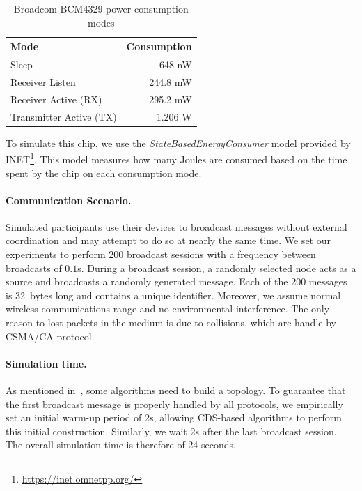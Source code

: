 \begin{table}[ht]
	\footnotesize
	\centering
	
	\begin{tabular}{lr}
		\textbf{Mode} & \textbf{Consumption} \\
		
		\midrule
		Sleep  & 648 nW \\ 
		Receiver Listen & 244.8 mW \\
		Receiver Active (RX) & 295.2 mW \\
		Transmitter Active (TX) & 1.206 W \\
	\end{tabular}
	
	\caption{Broadcom BCM4329 power consumption modes}
\end{table}

%
To simulate this chip, we use the \emph{StateBasedEnergyConsumer} model provided by INET\footnote{\url{https://inet.omnetpp.org/}}. 
%
This model measures how many Joules are consumed based on the time spent by the chip  on each consumption mode.


\paragraph{Communication Scenario.}
Simulated participants use their devices to broadcast messages without external coordination and may attempt to do so at nearly the same time.
%
We set our experiments to perform 200 broadcast sessions with a frequency between broadcasts of $0.1$s.
%
During a broadcast session, a randomly selected node acts as a source and broadcasts a randomly generated message.
%
Each of the 200 messages is 32~bytes long and contains a unique identifier.
%
Moreover, we assume normal wireless communications range and no environmental interference.
%
The only reason to lost packets in the medium is due to collisions, which are handle by CSMA/CA protocol.

\paragraph{Simulation time.}
As mentioned in~, some algorithms need to build a topology.
%
To guarantee that the first broadcast message is properly handled by all protocols, we empirically set an initial warm-up period of 2s, allowing CDS-based algorithms to perform this initial construction.
%
Similarly, we  wait 2s after the last broadcast session.
%
The overall simulation time is therefore of 24 seconds.


